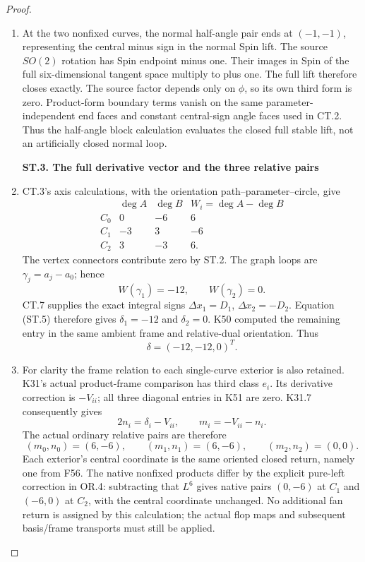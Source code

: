 \begin{proof}
\begin{enumerate}[label=\arabic*.]
\item At the two nonfixed curves, the normal half-angle pair ends at
\((-1,-1)\), representing the central minus sign in the normal
Spin lift. The source \(SO(2)\) rotation has Spin endpoint minus
one. Their images in Spin of the full six-dimensional tangent
space multiply to plus one. The full lift therefore closes exactly.
The source factor depends only on \(\phi\), so its own third
form is zero. Product-form boundary terms vanish on the same
parameter-independent end faces and constant central-sign angle
faces used in CT.2. Thus the half-angle block calculation evaluates
the closed full stable lift, not an artificially closed normal loop.

\par

\medskip\noindent\textbf{ST.3. The full derivative vector and the three relative pairs}

\par\nobreak

\item CT.3's axis calculations, with the orientation
path--parameter--circle, give
\[
 \begin{array}{c|rr|r}
 &\deg A&\deg B&W_i=\deg A-\deg B\\ \hline
 C_0&0&-6&6\\
 C_1&-3&3&-6\\
 C_2&3&-3&6.
 \end{array}                                             \tag{ST.8}
\]
The vertex connectors contribute zero by ST.2. The graph loops are
\(\gamma_j=a_j-a_0\); hence
\[
                  W(\gamma_1)=-12,\qquad W(\gamma_2)=0.
\]
CT.7 supplies the exact integral signs
\(\Delta x_1=D_1\), \(\Delta x_2=-D_2\). Equation (ST.5)
therefore gives \(\delta_1=-12\) and \(\delta_2=0\).
K50 computed the remaining entry in the same ambient frame and
relative-dual orientation. Thus
\[
                       \delta=(-12,-12,0)^T.           \tag{ST.9}
\]

\item For clarity the frame relation to each single-curve exterior is also
retained. K31's actual product-frame comparison has third class
\(e_i\). Its derivative correction is \(-V_{ii}\); all three
diagonal entries in K51 are zero. K31.7 consequently gives
\[
 2n_i=\delta_i-V_{ii},\qquad m_i=-V_{ii}-n_i.
\]
The actual ordinary relative pairs are therefore
\[
 (m_0,n_0)=(6,-6),\qquad
 (m_1,n_1)=(6,-6),\qquad
 (m_2,n_2)=(0,0).                                     \tag{ST.10}
\]
Each exterior's central coordinate is the same oriented closed
return, namely one from F56. The native nonfixed products differ by
the explicit pure-left correction in OR.4: subtracting that \(L^6\)
gives native pairs \((0,-6)\) at \(C_1\) and \((-6,0)\) at
\(C_2\), with the central coordinate unchanged. No additional fan
return is assigned by this calculation; the actual flop maps and
subsequent basis/frame transports must still be applied.


\end{enumerate}
\end{proof}
